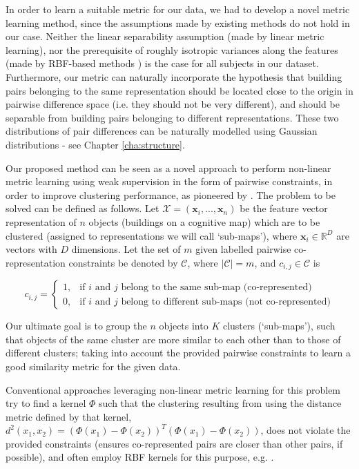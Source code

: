 In order to learn a suitable metric for our data, we had to develop a novel metric learning method, since the assumptions made by existing methods do not hold in our case. Neither the linear separability assumption (made by linear metric learning), nor the prerequisite of roughly isotropic variances along the features (made by RBF-based methods \citep{ong2005learning}) is the case for all subjects in our dataset. Furthermore, our metric can naturally incorporate the hypothesis that building pairs belonging to the same representation should be located close to the origin in pairwise difference space (i.e. they should not be very different), and should be separable from building pairs belonging to different representations. These two distributions of pair differences can be naturally modelled using Gaussian distributions - see Chapter \ref{cha:structure}. 

Our proposed method can be seen as a novel approach to perform non-linear metric learning using weak supervision in the form of pairwise constraints, in order to improve clustering performance, as pioneered by \cite{xing2002distance}. The problem to be solved can be defined as follows. Let $\mathcal{X}=(\boldsymbol x_i, ..., \boldsymbol x_n)$ be the feature vector representation of $n$ objects (buildings on a cognitive map) which are to be clustered (assigned to representations we will call `sub-maps'), where $\bm x_i \in \mathbb{R}^D$ are vectors with $D$ dimensions. Let the set of $m$ given labelled pairwise co-representation constraints be denoted by $\mathcal{C}$, where $ \lvert \mathcal{C} \lvert = m $, and $c_{i,j} \in \mathcal{C}$ is

\begin{equation}
c_{i,j}=
\begin{cases}
1, & \text{if $i$ and $j$ belong to the same sub-map (co-represented)} \\
0, & \text{if $i$ and $j$ belong to different sub-maps (not co-represented)}
\end{cases}
\end{equation}

Our ultimate goal is to group the $n$ objects into $K$ clusters (`sub-maps'), such that objects of the same cluster are more similar to each other than to those of different clusters; taking into account the provided pairwise constraints to learn a good similarity metric for the given data.

Conventional approaches leveraging non-linear metric learning for this problem try to find a kernel $\Phi$ such that the clustering resulting from using the distance metric defined by that kernel, $d^2(x_1, x_2)=(\Phi(x_1)-\Phi(x_2))^T(\Phi(x_1)-\Phi(x_2))$, does not violate the provided constraints (ensures co-represented pairs are closer than other pairs, if possible), and often employ RBF kernels for this purpose, e.g. \citep{baghshah2010kernel, chitta2011approximate}. 

